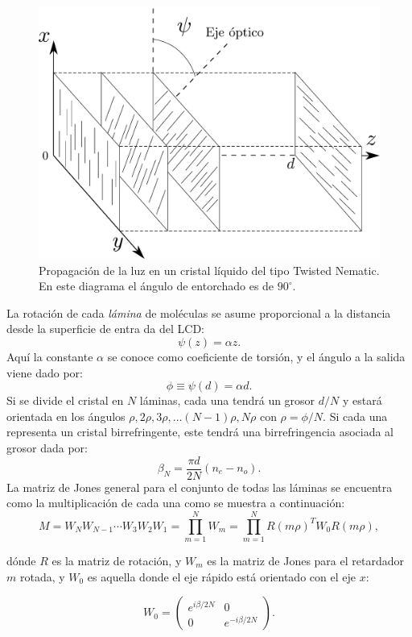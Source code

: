 \begin{figure}[h!]
\centering
\includegraphics[scale = .3]{TN-LCD_sticks}
\caption[Propagación de la luz en un TN-LC]{Propagación de la luz en
  un cristal líquido del tipo Twisted 
  Nematic. En este diagrama el ángulo de entorchado es de $90^{\circ}$.}
\label{fig:tn-lcd_sticks}
\end{figure}

La rotación de cada \textit{lámina} de
moléculas se asume proporcional a la distancia desde la superficie de
entra da del LCD:
\begin{equation}
  \label{eq:twist_angle}
\psi(z)  =\alpha z.  
\end{equation}
Aquí la constante $\alpha$
se conoce como coeficiente de torsión, y el ángulo a la salida viene
dado por: $$\phi \equiv \psi(d)=\alpha d.$$ Si se divide el cristal en
$N$ láminas, cada una tendrá un grosor $d/N$ y estará orientada en los ángulos
$\rho,2\rho,3\rho,\dots\left(N-1\right)\rho,N\rho$ con
$\rho=\phi/N$. Si cada una representa un cristal birrefringente, este tendrá una
birrefringencia asociada al grosor dada por: $$\beta_N = \frac{\pi
  d}{2N}\left(n_e-n_o\right).$$
La matriz de Jones general para el conjunto de todas las láminas se
encuentra como la multiplicación de cada una como se muestra a
continuación:
\[ M= W_NW_{N-1}\cdots W_3W_2W_1=\prod_{m=1}^NW_m = \prod_{m=1}^NR(m\rho)^TW_0R(m\rho), \]

dónde $R$ es la matriz de rotación, y $W_m$ es la matriz de Jones para
el retardador $m$ rotada, y $W_0$ es aquella donde el eje rápido está
orientado con el eje $x$:

\begin{equation*}
W_0 =
\begin{pmatrix}
  e^{i\beta/2N} &0 \\ 0 & e^{-i\beta/2N} 
\end{pmatrix}.
\end{equation*}


